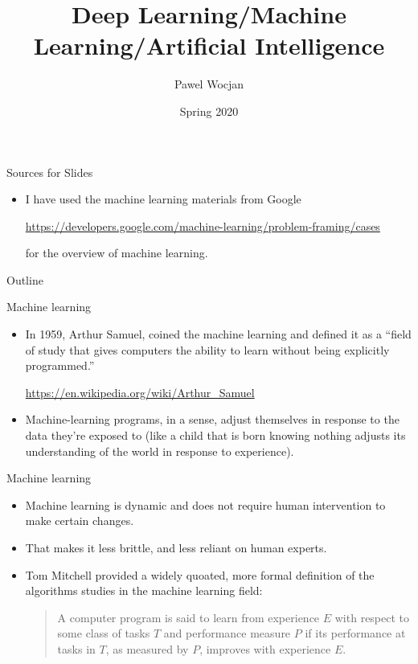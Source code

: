 \documentclass{beamer}
\title[AI]{Deep Learning/Machine Learning/Artificial Intelligence}
\author{Pawel Wocjan}
\institute{University of Central Florida}
\date{Spring 2020}
\begin{document}
\begin{frame}
  \titlepage
\end{frame}

\begin{frame}{Sources for Slides}

\begin{itemize}
\item I have used the machine learning materials from Google

{\small 
\url{https://developers.google.com/machine-learning/problem-framing/cases}
}

for the overview of machine learning.
\end{itemize}
\end{frame}

\begin{frame}{Outline}
  \tableofcontents
\end{frame}

\begin{frame}{Machine learning}
\begin{itemize}
\item In 1959, Arthur Samuel, coined the machine learning and defined it as a ``field of study that gives computers the ability to learn without being explicitly programmed.''

\url{https://en.wikipedia.org/wiki/Arthur_Samuel}

\item Machine-learning programs, in a sense, adjust themselves in response to the data they’re exposed to (like a child that is born knowing nothing adjusts its understanding of the world in response to experience).
\end{itemize}
\end{frame}

\begin{frame}{Machine learning}

\begin{itemize}
\item Machine learning is dynamic and does not require human intervention to make certain changes. 

\item That makes it less brittle, and less reliant on human experts.

\item Tom Mitchell provided a widely quoated, more formal definition of the algorithms studies in the machine learning field:

\medskip
\begin{quote}
A computer program is said to learn from experience $E$ with respect to some class of tasks $T$ and performance measure $P$ if its performance at tasks in $T$, as measured by $P$, improves with experience $E$.
\end{quote}
\end{itemize}

\end{frame}
\end{document}

